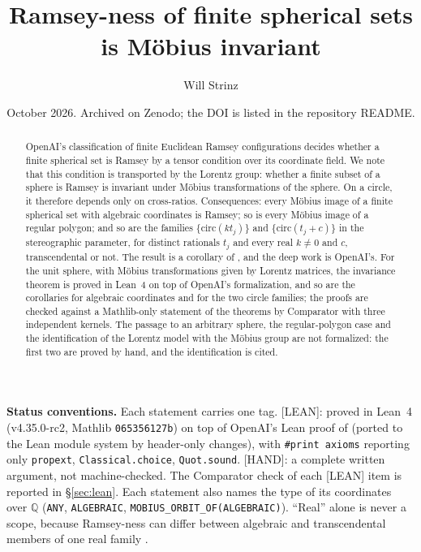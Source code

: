 \documentclass[11pt]{amsart}
\title{Ramsey-ness of finite spherical sets is M\"obius invariant}
\author{Will Strinz}
\date{October 2026. Archived on Zenodo; the DOI is listed in the repository README.}
\newcommand{\st}[1]{\textsf{[#1]}}
\newcommand{\Q}{\mathbb{Q}}
\newcommand{\circmap}{\mathrm{circ}}
\theoremstyle{plain}
\theoremstyle{definition}
\begin{document}
\begin{abstract}
OpenAI's classification of finite Euclidean Ramsey configurations \cite{OAI172} decides whether
a finite spherical set is Ramsey by a tensor condition over its coordinate field. We note that
this condition is transported by the Lorentz group: whether a finite subset of a sphere is
Ramsey is invariant under M\"obius transformations of the sphere. On a circle, it therefore
depends only on cross-ratios. Consequences: every M\"obius image of a finite spherical set
with algebraic coordinates is Ramsey; so is every M\"obius image of a regular polygon; and so
are the families $\{\circmap(kt_j)\}$ and $\{\circmap(t_j+c)\}$ in the stereographic
parameter, for distinct rationals $t_j$ and every real $k\ne0$ and $c$, transcendental or not.
The result is a corollary of \cite{OAI172}, and the deep work is OpenAI's.
For the unit sphere, with M\"obius transformations given by Lorentz matrices, the invariance
theorem is proved in Lean~4 on top of OpenAI's formalization, and so are the corollaries for
algebraic coordinates and for the two circle families; the proofs are checked against a
Mathlib-only statement of the theorems by Comparator with three independent kernels. The
passage to an arbitrary sphere, the regular-polygon case and the identification of the Lorentz
model with the M\"obius group are not formalized: the first two are proved by hand, and the
identification is cited.
\end{abstract}

\maketitle

\noindent\textbf{Status conventions.} Each statement carries one tag.
\st{LEAN}: proved in Lean~4 (v4.35.0-rc2, Mathlib \texttt{065356127b}) on top of OpenAI's Lean
proof of \cite{OAI172} (ported to the Lean module system by header-only changes), with
\texttt{\#print axioms} reporting only \texttt{propext}, \texttt{Classical.choice},
\texttt{Quot.sound}.
\st{HAND}: a complete written argument, not machine-checked. The Comparator \cite{Comparator}
check of each \st{LEAN} item is reported in \S\ref{sec:lean}. Each statement
also names the type of its coordinates over $\Q$ (\texttt{ANY}, \texttt{ALGEBRAIC},
\texttt{MOBIUS\_ORBIT\_OF(ALGEBRAIC)}). ``Real'' alone is never a scope, because Ramsey-ness can
differ between algebraic and transcendental members of one real family
\cite[Prop.~7.6]{OAI172}.
\end{document}
